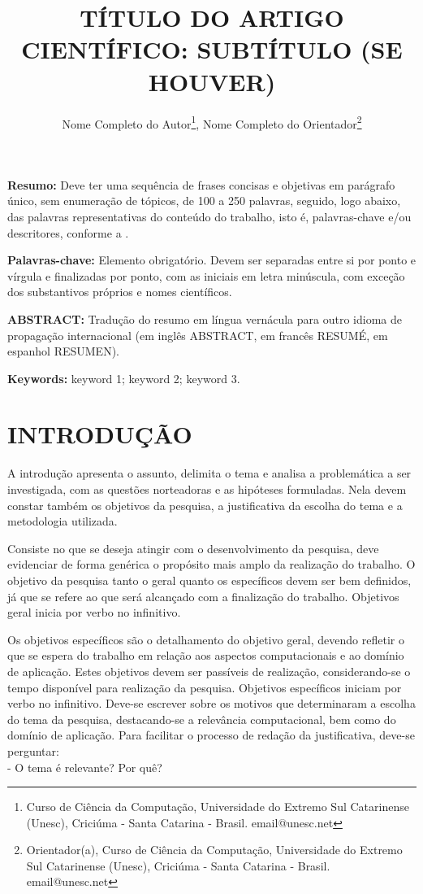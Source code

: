 \documentclass{UNESC}
\title{TÍTULO DO ARTIGO CIENTÍFICO: SUBTÍTULO (SE HOUVER)}
\author
{
   Nome Completo do Autor\footnote{Curso de Ciência da Computação, Universidade do Extremo Sul Catarinense (Unesc), Criciúma - Santa Catarina - Brasil. email@unesc.net},
   Nome Completo do Orientador\footnote{Orientador(a), Curso de Ciência da Computação, Universidade do Extremo Sul Catarinense (Unesc), Criciúma - Santa Catarina - Brasil. email@unesc.net}
}
\begin{document}
\onehalfspacing

\maketitle

\noindent
\textbf{Resumo:} Deve ter uma sequência de frases concisas e objetivas em parágrafo único, sem enumeração de tópicos, de 100 a 250 palavras, seguido, logo abaixo, das palavras representativas do conteúdo do trabalho, isto é, palavras-chave e/ou descritores, conforme a .

\vspace{0.5em}
\noindent
\textbf{Palavras-chave:} Elemento obrigatório. Devem ser separadas entre si por ponto e vírgula e finalizadas por ponto, com as iniciais em letra minúscula, com exceção dos substantivos próprios e nomes científicos. 

\vspace{1.0em}
\noindent
\textbf{ABSTRACT:} Tradução do resumo em língua vernácula para outro idioma de propagação internacional (em inglês ABSTRACT, em francês RESUMÉ, em espanhol RESUMEN).

\vspace{0.5em}
\noindent
\textbf{Keywords:} keyword 1; keyword 2; keyword 3.


\section{INTRODUÇÃO}

A introdução apresenta o assunto, delimita o tema e analisa a problemática a ser investigada, com as questões norteadoras e as hipóteses formuladas. Nela devem constar também os objetivos da pesquisa, a justificativa da escolha do tema e a metodologia utilizada.

Consiste no que se deseja atingir com o desenvolvimento da pesquisa, deve evidenciar de forma genérica o propósito mais amplo da realização do trabalho. O objetivo da pesquisa tanto o geral quanto os específicos devem ser bem definidos, já que se refere ao que será alcançado com a finalização do trabalho. Objetivos geral inicia por verbo no infinitivo.



Os objetivos específicos são o detalhamento do objetivo geral, devendo refletir o que se espera do trabalho em relação aos aspectos computacionais e ao domínio de aplicação. Estes objetivos devem ser passíveis de realização, considerando-se o tempo disponível para realização da pesquisa. Objetivos específicos iniciam por verbo no infinitivo.
Deve-se escrever sobre os motivos que determinaram a escolha do tema da pesquisa, destacando-se a relevância computacional, bem como do domínio de aplicação. 
Para facilitar o processo de redação da justificativa, deve-se perguntar: \\
-	O tema é relevante? Por quê? 
\end{document}
